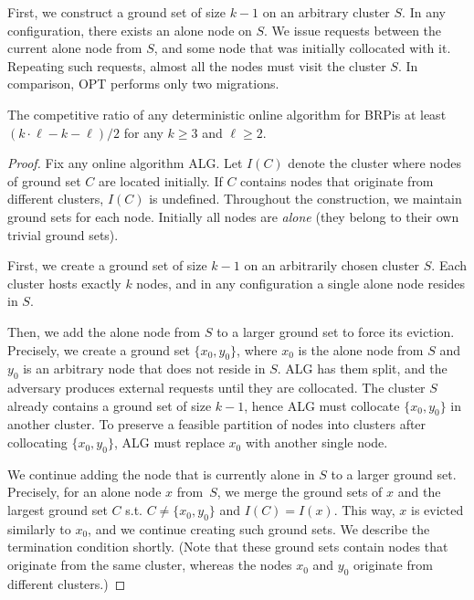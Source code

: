 \documentclass[manuscript,screen=true, review, anonymous]{acmart}
\newcommand{\OPT}{\textsf{OPT}\xspace}
\newcommand{\ALG}{\textsf{ALG}\xspace}
\newcommand{\OBRP}{BRP}
\begin{document}
First, we construct a ground set of size $k-1$ on an arbitrary cluster $S$.
In any configuration, there exists an alone node on $S$.
We issue requests between the current alone node from $S$, and some node that was initially collocated with it.
Repeating such requests, almost all the nodes must visit the cluster $S$.
In comparison, \OPT performs only two migrations.

\begin{theorem}
	\label{th:lowerbound}
	The competitive ratio of any deterministic online algorithm for \OBRP is at least $(k\cdot \ell - k - \ell)/2$ for any $k\geq 3$ and $\ell \geq 2$.
\end{theorem}

\begin{proof}
	Fix any online algorithm \ALG{}.
	Let $I(C)$ denote the cluster where nodes of ground set $C$ are located initially.
	If $C$ contains nodes that originate from different clusters, $I(C)$ is undefined.
	Throughout the construction, we maintain ground sets for each node.
	Initially all nodes are \emph{alone} (they belong to their own trivial ground sets).

	First, we create a ground set of size $k-1$ on an arbitrarily chosen cluster $S$.
	Each cluster hosts exactly $k$ nodes, and in any configuration a single alone node resides in $S$.

	Then, we add the alone node from $S$ to a larger ground set to force its eviction.
	Precisely,
	we create a ground set $\{x_0, y_0\}$, 
	where $x_0$ is the alone node from $S$ and $y_0$ is an arbitrary node that does not reside in $S$.
	\ALG has them split, and the adversary produces external requests until they are collocated.
	The cluster $S$ already contains a ground set of size $k-1$, hence \ALG must collocate $\{x_0, y_0\}$ in another cluster.
	To preserve a feasible partition of nodes into clusters after collocating $\{x_0, y_0\}$,
	\ALG must replace $x_0$ with another single node.
	

	We continue adding the node that is currently alone in $S$ to a larger ground set.
	Precisely, for an alone node $x$ from~$S$, we merge the ground sets of $x$ and the largest ground set $C$ s.t. $C \neq \{x_0,y_0\}$ and $I(C) = I(x)$.
	This way, $x$ is evicted similarly to $x_0$, and we continue creating such ground sets.
	We describe the termination condition shortly.
	(Note that these ground sets contain nodes that originate from the same cluster, whereas the nodes $x_0$ and $y_0$ originate from different clusters.)


\end{proof}
\end{document}
